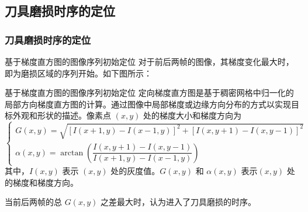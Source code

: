 \documentclass[aspectratio=169,t,xcolor=table,10pt]{ctexbeamer}
\numberwithin{equation}{section} %
\begin{document}
	\subsection{刀具磨损时序的定位}
	\begin{frame}
		\frametitle{刀具磨损时序的定位}
		\begin{block}{基于梯度直方图的图像序列初始定位}
			\qquad 对于前后两帧的图像，其梯度变化最大时，即为磨损区域的序列开始。如下图所示：
			\begin{figure}[H]
				\centering
				\hspace*{48pt}
			\end{figure}
		\end{block}
	\end{frame}

	\begin{frame}
		\begin{block}{基于梯度直方图的图像序列初始定位}
			\qquad 定向梯度直方图是基于稠密网格中归一化的局部方向梯度直方图的计算。通过图像中局部梯度或边缘方向分布的方式以实现目标外观和形状的描述。像素点 $(x,y)$ 处的梯度大小和梯度方向为
			\begin{equation}
				\begin{cases}
					G(x,y) = \sqrt{\left[I(x+1,y)-I(x-1,y)\right]^2+\left[I(x,y+1)-I(x,y-1)\right]^2} \\
					\alpha(x,y) = \arctan\left(\dfrac{I(x,y+1)-I(x,y-1)}{I(x+1,y)-I(x-1,y)}\right)
				\end{cases}
			\end{equation}
			其中，$I(x,y)$ 表示 $(x,y)$ 处的灰度值。$G(x,y)$ 和 $\alpha(x,y)$ 表示$(x,y)$ 处的梯度和梯度方向。
			
			\qquad 当前后两帧的总 $G(x,y)$ 之差最大时，认为进入了刀具磨损的时序。
		\end{block}
	\end{frame}
\end{document}
